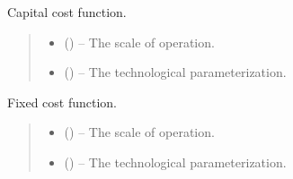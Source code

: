 \documentclass[letterpaper,10pt,english]{sphinxmanual}
\begin{document}
\begin{fulllineitems}
\label{\detokenize{technology:technology.simple_electrolysis.capital_cost}}
\pysigstartsignatures
{}
\pysigstopsignatures
\sphinxAtStartPar
Capital cost function.
\begin{quote}\begin{description}
\begin{itemize}
\item {} 
\sphinxAtStartPar
{} () – The scale of operation.

\item {} 
\sphinxAtStartPar
{} () – The technological parameterization.

\end{itemize}

\end{description}\end{quote}

\end{fulllineitems}


\begin{fulllineitems}
\label{\detokenize{technology:technology.simple_electrolysis.fixed_cost}}
\pysigstartsignatures
{}
\pysigstopsignatures
\sphinxAtStartPar
Fixed cost function.
\begin{quote}\begin{description}
\begin{itemize}
\item {} 
\sphinxAtStartPar
{} () – The scale of operation.

\item {} 
\sphinxAtStartPar
{} () – The technological parameterization.

\end{itemize}

\end{description}\end{quote}

\end{fulllineitems}
\end{document}
